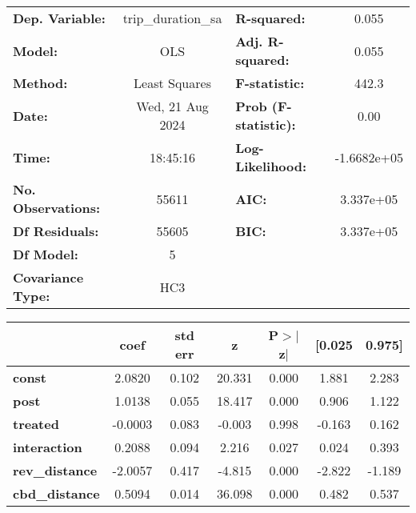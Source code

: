 \begin{center}
\begin{tabular}{lclc}
\toprule
\textbf{Dep. Variable:}    & trip\_duration\_sa & \textbf{  R-squared:         } &      0.055   \\
\textbf{Model:}            &        OLS         & \textbf{  Adj. R-squared:    } &      0.055   \\
\textbf{Method:}           &   Least Squares    & \textbf{  F-statistic:       } &      442.3   \\
\textbf{Date:}             &  Wed, 21 Aug 2024  & \textbf{  Prob (F-statistic):} &      0.00    \\
\textbf{Time:}             &      18:45:16      & \textbf{  Log-Likelihood:    } & -1.6682e+05  \\
\textbf{No. Observations:} &        55611       & \textbf{  AIC:               } &  3.337e+05   \\
\textbf{Df Residuals:}     &        55605       & \textbf{  BIC:               } &  3.337e+05   \\
\textbf{Df Model:}         &            5       & \textbf{                     } &              \\
\textbf{Covariance Type:}  &        HC3         & \textbf{                     } &              \\
\bottomrule
\end{tabular}
\begin{tabular}{lcccccc}
                       & \textbf{coef} & \textbf{std err} & \textbf{z} & \textbf{P$> |$z$|$} & \textbf{[0.025} & \textbf{0.975]}  \\
\midrule
\textbf{const}         &       2.0820  &        0.102     &    20.331  &         0.000        &        1.881    &        2.283     \\
\textbf{post}          &       1.0138  &        0.055     &    18.417  &         0.000        &        0.906    &        1.122     \\
\textbf{treated}       &      -0.0003  &        0.083     &    -0.003  &         0.998        &       -0.163    &        0.162     \\
\textbf{interaction}   &       0.2088  &        0.094     &     2.216  &         0.027        &        0.024    &        0.393     \\
\textbf{rev\_distance} &      -2.0057  &        0.417     &    -4.815  &         0.000        &       -2.822    &       -1.189     \\
\textbf{cbd\_distance} &       0.5094  &        0.014     &    36.098  &         0.000        &        0.482    &        0.537     \\

\end{tabular}
\end{center}

